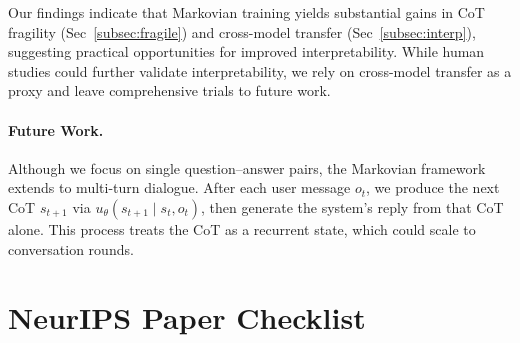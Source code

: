 \documentclass{article}
\begin{document}
Our findings indicate that Markovian training yields substantial gains in CoT fragility (Sec~\ref{subsec:fragile}) and cross-model transfer (Sec~\ref{subsec:interp}), suggesting practical opportunities for improved interpretability. While human studies could further validate interpretability, we rely on cross-model transfer as a proxy and leave comprehensive trials to future work.

\paragraph{Future Work.}
Although we focus on single question–answer pairs, the Markovian framework extends to multi-turn dialogue. After each user message $o_t$, we produce the next CoT $s_{t+1}$ via $u_\theta(s_{t+1}\mid s_t,o_t)$, then generate the system's reply from that CoT alone. This process treats the CoT as a recurrent state, which could scale to conversation rounds.







\newpage
\section*{NeurIPS Paper Checklist}
\end{document}
